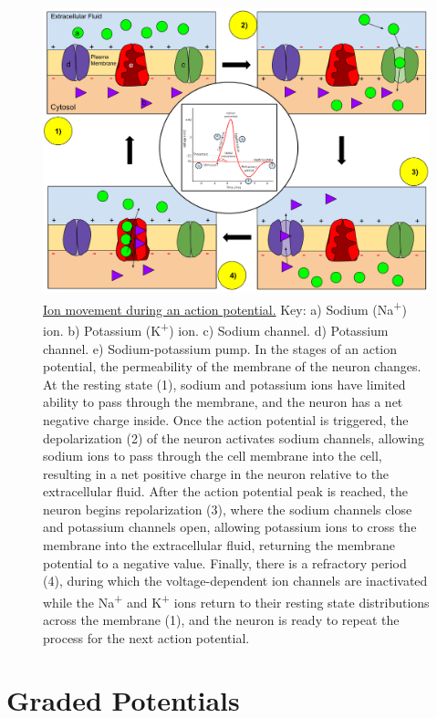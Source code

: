 \begin{figure}

{\centering \includegraphics[width=0.7\linewidth]{./figures/potential/ActionPotential} 

}

\caption{\href{https://commons.wikimedia.org/wiki/File:Membrane_Permeability_of_a_Neuron_During_an_Action_Potential.svg}{Ion movement during an action potential.} Key: a) Sodium (Na\textsuperscript{+}) ion. b) Potassium (K\textsuperscript{+}) ion. c) Sodium channel. d) Potassium channel. e) Sodium-potassium pump. In the stages of an action potential, the permeability of the membrane of the neuron changes. At the resting state (1), sodium and potassium ions have limited ability to pass through the membrane, and the neuron has a net negative charge inside. Once the action potential is triggered, the depolarization (2) of the neuron activates sodium channels, allowing sodium ions to pass through the cell membrane into the cell, resulting in a net positive charge in the neuron relative to the extracellular fluid. After the action potential peak is reached, the neuron begins repolarization (3), where the sodium channels close and potassium channels open, allowing potassium ions to cross the membrane into the extracellular fluid, returning the membrane potential to a negative value. Finally, there is a refractory period (4), during which the voltage-dependent ion channels are inactivated while the Na\textsuperscript{+} and K\textsuperscript{+} ions return to their resting state distributions across the membrane (1), and the neuron is ready to repeat the process for the next action potential.}\label{fig:actionpotential}
\end{figure}

\hypertarget{graded-potentials}{%
\section{Graded Potentials}\label{graded-potentials}}

